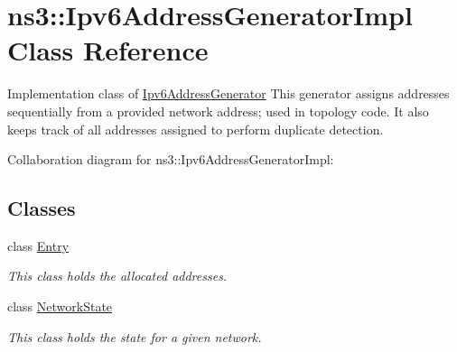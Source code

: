 \hypertarget{classns3_1_1Ipv6AddressGeneratorImpl}{}\section{ns3\+:\+:Ipv6\+Address\+Generator\+Impl Class Reference}
\label{classns3_1_1Ipv6AddressGeneratorImpl}


Implementation class of \hyperlink{classns3_1_1Ipv6AddressGenerator}{Ipv6\+Address\+Generator} This generator assigns addresses sequentially from a provided network address; used in topology code. It also keeps track of all addresses assigned to perform duplicate detection.  




Collaboration diagram for ns3\+:\+:Ipv6\+Address\+Generator\+Impl\+:
\subsection*{Classes}
\begin{DoxyCompactItemize}
\item 
class \hyperlink{classns3_1_1Ipv6AddressGeneratorImpl_1_1Entry}{Entry}
\begin{DoxyCompactList}\small\item\em This class holds the allocated addresses. \end{DoxyCompactList}\item 
class \hyperlink{classns3_1_1Ipv6AddressGeneratorImpl_1_1NetworkState}{Network\+State}
\begin{DoxyCompactList}\small\item\em This class holds the state for a given network. \end{DoxyCompactList}\end{DoxyCompactItemize}
